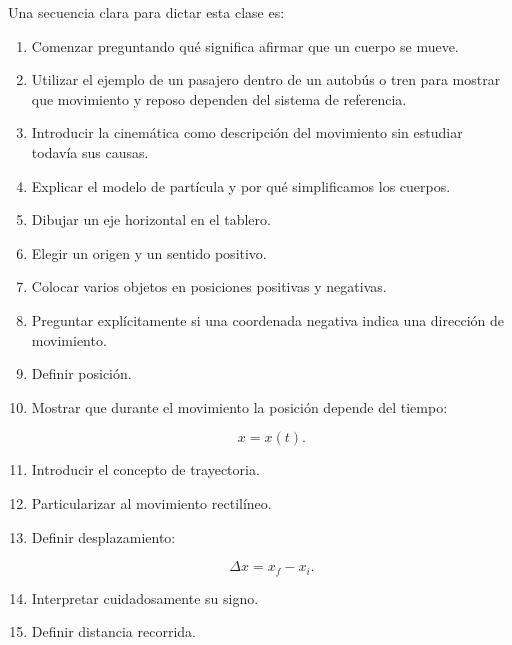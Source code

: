 \begin{notapedagogica}
Una secuencia clara para dictar esta clase es:

\begin{enumerate}

    \item Comenzar preguntando qué significa afirmar que un cuerpo se mueve.

    \item Utilizar el ejemplo de un pasajero dentro de un autobús o tren para
    mostrar que movimiento y reposo dependen del sistema de referencia.

    \item Introducir la cinemática como descripción del movimiento sin
    estudiar todavía sus causas.

    \item Explicar el modelo de partícula y por qué simplificamos los cuerpos.

    \item Dibujar un eje horizontal en el tablero.

    \item Elegir un origen y un sentido positivo.

    \item Colocar varios objetos en posiciones positivas y negativas.

    \item Preguntar explícitamente si una coordenada negativa indica una
    dirección de movimiento.

    \item Definir posición.

    \item Mostrar que durante el movimiento la posición depende del tiempo:

    \[
    x=x(t).
    \]

    \item Introducir el concepto de trayectoria.

    \item Particularizar al movimiento rectilíneo.

    \item Definir desplazamiento:

    \[
    \Delta x=x_f-x_i.
    \]

    \item Interpretar cuidadosamente su signo.

    \item Definir distancia recorrida.


\end{enumerate}
\end{notapedagogica}
